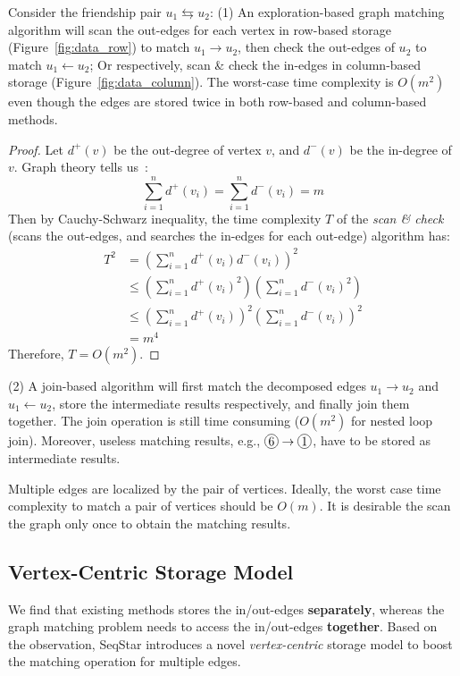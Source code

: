 Consider the friendship pair $u_1 \leftrightarrows u_2$:
(1) An exploration-based graph matching algorithm will scan the out-edges for each vertex in row-based storage (Figure~\ref{fig:data_row}) to match $u_1 \rightarrow u_2$,
then check the out-edges of $u_2$ to match $u_1 \leftarrow u_2$;
Or respectively, scan \& check the in-edges in column-based storage (Figure~\ref{fig:data_column}).
The worst-case time complexity is $O(m^2)$ even though the edges are stored twice in both row-based and column-based methods.
\begin{proof}
  Let $d^{+}(v)$ be the out-degree of vertex $v$, and $d^{-}(v)$ be the in-degree of $v$.
  Graph theory tells us~\cite{DBLP:books/sp/BondyM08}:
  \[ \sum_{i=1}^{n}d^{+}(v_i) = \sum_{i=1}^{n}d^{-}(v_i) = m \]
  Then by Cauchy-Schwarz inequality, the time complexity $T$ of the \emph{scan \& check} (scans the out-edges, and searches the in-edges for each out-edge) algorithm has:
  \begin{align*}
    T^2 &= {\left(\sum_{i=1}^{n}d^{+}(v_i)d^{-}(v_i)\right)}^2 \\
    &\le \left(\sum_{i=1}^{n}{d^{+}(v_i)}^2\right)\left(\sum_{i=1}^{n}{d^{-}(v_i)}^2\right) \\
    &\le {\left(\sum_{i=1}^{n}{d^{+}(v_i)}\right)}^2{\left(\sum_{i=1}^{n}{d^{-}(v_i)}\right)}^2 \\
    &= m^4
  \end{align*}
  Therefore, $T = O(m^2)$.
\end{proof}
(2) A join-based algorithm will first match the decomposed edges $u_1 \rightarrow u_2$ and $u_1 \leftarrow u_2$,
store the intermediate results respectively, and finally join them together.
The join operation is still time consuming ($O(m^2)$ for nested loop join).
Moreover, useless matching results, e.g., $\circled{6} \rightarrow \circled{1}$, have to be stored as intermediate results.

Multiple edges are localized by the pair of vertices.
Ideally, the worst case time complexity to match a pair of vertices should be $O(m)$.
It is desirable the scan the graph only once to obtain the matching results.

\subsection{Vertex-Centric Storage Model}
We find that existing methods stores the in/out-edges \textbf{separately},
whereas the graph matching problem needs to access the in/out-edges \textbf{together}.
Based on the observation, SeqStar introduces a novel \emph{vertex-centric} storage model to boost the matching operation for multiple edges.

